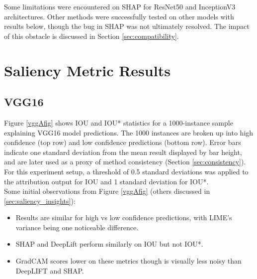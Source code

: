 \documentclass[main]{subfiles}
\begin{document}
Some limitations were encountered on SHAP for ResNet50 and InceptionV3 architectures. Other methods were successfully tested on other models with results below, though the bug in SHAP was not ultimately resolved. The impact of this obstacle is discussed in Section \ref{sec:compatibility}.

\section{Saliency Metric Results}
\subsection{VGG16} \label{sec:vggExp}

Figure \ref{vggAfig} shows IOU and IOU* statistics for a 1000-instance sample explaining VGG16 model predictions. The 1000 instances are broken up into high confidence (top row) and low confidence predictions (bottom row). Error bars indicate one standard deviation from the mean result displayed by bar height, and are later used as a proxy of method consistency (Section \ref{sec:consistency}). For this experiment setup, a threshold of 0.5 standard deviations was applied to the attribution output for IOU and 1 standard deviation for IOU*.\\

\vspace{0.1in}
\noindent Some initial observations from Figure \ref{vggAfig} (others discussed in \ref{sec:saliency_insights}):
\begin{itemize}
\item Results are similar for high vs low confidence predictions, with LIME's variance being one noticeable difference.
\item SHAP and DeepLift perform similarly on IOU but not IOU*.
\item GradCAM scores lower on these metrics though is visually less noisy than DeepLIFT and SHAP.
\end{itemize}


\newpage

\end{document}
